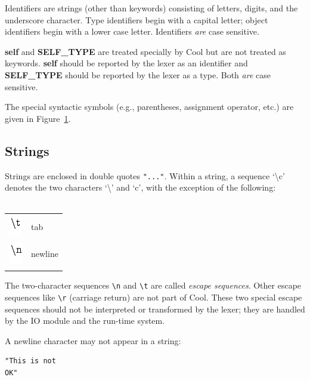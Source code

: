\documentclass[]{article}
\begin{document}
Identifiers are strings (other than keywords) consisting of letters,
digits, and the underscore character. Type identifiers begin with a
capital letter; object identifiers begin with a lower case letter.
Identifiers \emph{are} case sensitive.

\textbf{self} and \textbf{SELF\_TYPE} are treated specially by Cool but
are not treated as keywords. \textbf{self} should be reported by the
lexer as an identifier and \textbf{SELF\_TYPE} should be reported by the
lexer as a type. Both \emph{are} case sensitive.

The special syntactic symbols (e.g., parentheses, assignment operator,
etc.) are given in Figure~\href{node39.html\#fig1}{1}.

\subsection{Strings}

Strings are enclosed in double quotes \texttt{"..."}. Within a string, a
sequence `\textbackslash{}c' denotes the two characters
`\textbackslash{}' and `c', with the exception of the following: \\ \\

\begin{longtable}[c]{@{}ll@{}}
\hline\noalign{\medskip}
\includegraphics{img33.png} & tab
\\\noalign{\medskip}
\includegraphics{img34.png} & newline
\\\noalign{\medskip}
\hline
\end{longtable}

The two-character sequences \texttt{\textbackslash{}n} and
\texttt{\textbackslash{}t} are called \emph{escape sequences}. Other
escape sequences like \texttt{\textbackslash{}r} (carriage return) are
not part of Cool. These two special escape sequences should not be
interpreted or transformed by the lexer; they are handled by the IO
module and the run-time system.

A newline character may not appear in a string:

\begin{verbatim}
"This is not
OK"
\end{verbatim}
\end{document}

